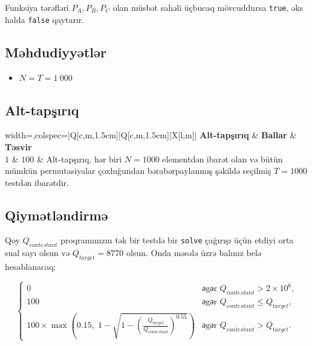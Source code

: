 \documentclass[12pt]{article}
\begin{document}
Funksiya tərəfləri $P_A,P_B,P_C$ olan müsbət sahəli üçbucaq mövcuddursa \texttt{true}, əks halda \texttt{false} qaytarır.

\subsection{Məhdudiyyətlər}
\vspace{0.1em}
\begin{itemize}
	\item $N = T = 1~000$
\end{itemize}

\subsection{Alt-tapşırıq}
\begin{table}[H]
	\begin{tblr}{width=\linewidth,colspec={|Q[c,m,1.5cm]|Q[c,m,1.5cm]|X[l,m]|}}
		\hline
		\textbf{Alt-tapşırıq} & \textbf{Ballar} & \textbf{Təsvir}\\
		\hline
		$1$ & $100$ & Alt-tapşırıq, hər biri $N=1000$ elementdən ibarət olan və bütün mümkün permutasiyalar çoxluğundan bərabərpaylanmış şəkildə seçilmiş $T=1000$ testdən ibarətdir. \\ 
		\hline
	\end{tblr}
	\caption*{Alt-tapşırıq üzrə ballar yalnız ona aid olan bütün testlər uğurla keçildikdə verilir.}
\end{table}
\FloatBarrier

\newpage
\subsection{Qiymətləndirmə}

Qoy $Q_{contestant}$ proqramınızın tək bir testdə bir \texttt{solve} çağırışı üçün etdiyi orta sual sayı olsun və $Q_{target}=8770$ olsun. Onda məsələ üzrə balınız belə hesablanacaq:

\[
\begin{cases}
0 & \text{əgər } Q_{contestant} > 2\times 10^6, \\
100 & \text{əgər } Q_{contestant} \le Q_{target}, \\
100 \times \max\left(0.15,\; 1-\sqrt{1-\left(\frac{Q_{target}}{Q_{contestant}}\right)^{0.55}}\right) & \text{əgər } Q_{contestant} > Q_{target}.
\end{cases}
\]
\end{document}
